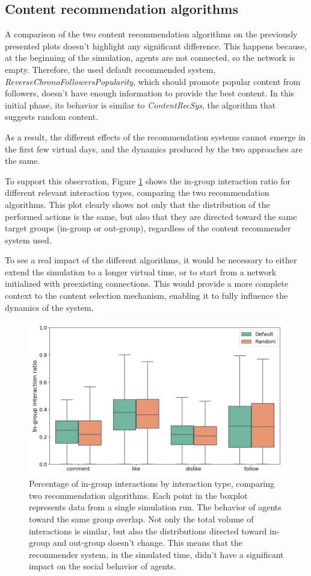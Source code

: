 \subsection{Content recommendation algorithms}
A comparison of the two content recommendation algorithms on the previously presented plots doesn't highlight any significant difference.
This happens because, at the beginning of the simulation, agents are not connected, so the network is empty.
Therefore, the used default recommended system, \textit{ReverseChronoFollowersPopularity}, which should promote popular content from followers, doesn't have enough information to provide the best content.
In this initial phase, its behavior is similar to \textit{ContentRecSys}, the algorithm that suggests random content.

As a result, the different effects of the recommendation systems cannot emerge in the first few virtual days, and the dynamics produced by the two approaches are the same.

To support this observation, Figure \ref{fig:recsys_comparison} shows the in-group interaction ratio for different relevant interaction types, comparing the two recommendation algorithms.
This plot clearly shows not only that the distribution of the performed actions is the same, but also that they are directed toward the same target groups (in-group or out-group), regardless of the content recommender system used.

To see a real impact of the different algorithms, it would be necessary to either extend the simulation to a longer virtual time, or to start from a network initialized with preexisting connections.
This would provide a more complete context to the content selection mechanism, enabling it to fully influence the dynamics of the system.



\begin{figure}[h]
    \centering
    \includegraphics[width=0.6\linewidth]{Images/RecSys/recsys_in_group_ratio.png}
    \caption{Percentage of in-group interactions by interaction type, comparing two recommendation algorithms.
    Each point in the boxplot represents data from a single simulation run.
    The behavior of agents toward the same group overlap.
    Not only the total volume of interactions is similar, but also the distributions directed toward in-group and out-group doesn't change.
    This means that the recommender system, in the simulated time, didn't have a significant impact on the social behavior of agents.}
    \label{fig:recsys_comparison}
\end{figure}